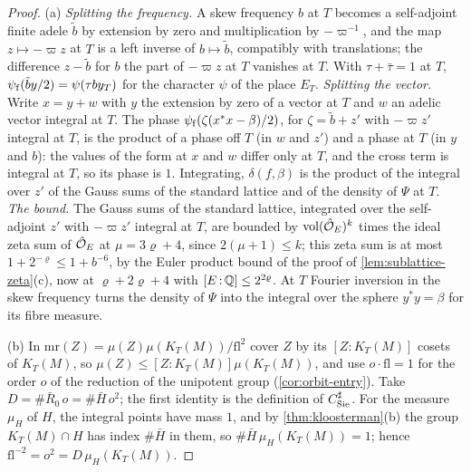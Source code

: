 \begin{proof}
(a) \emph{Splitting the frequency.} A skew frequency $b$ at $T$ becomes a self-adjoint finite adele $\tilde b$ by extension by zero and multiplication by $-\varpi^{-1}$, and the map $z\mapsto-\varpi z$ at $T$ is a left
inverse of $b\mapsto\tilde b$, compatibly with translations; the difference $z-\tilde b$ for $b$ the part of $-\varpi z$ at $T$ vanishes at $T$. With $\tau+\bar\tau=1$ at $T$, $\psi_{\rm f}(\tilde by/2)=\psi(\tau by_T)$ for the character
$\psi$ of the place $E_T$. \emph{Splitting the vector.} Write $x=y+w$ with $y$ the extension by zero of a vector at $T$ and $w$ an adelic vector integral at $T$. The phase $\psi_{\rm f}(\zeta(x^*x-\beta)/2)$, for
$\zeta=\tilde b+z'$ with $-\varpi z'$ integral at $T$, is the product of a phase off $T$ (in $w$ and $z'$) and a phase at $T$ (in $y$ and $b$): the values of the form at $x$ and $w$ differ only at $T$, and the cross term is
integral at $T$, so its phase is $1$. Integrating, $\delta(f,\beta)$ is the product of the integral over $z'$ of the Gauss sums of the standard lattice and of the density of $\Psi$ at $T$. \emph{The bound.} The
Gauss sums of the standard lattice, integrated over the self-adjoint $z'$ with $-\varpi z'$ integral at $T$, are bounded by $\operatorname{vol}(\hat{\mathcal{O}}_E)^k$ times the ideal zeta sum of $\hat{\mathcal{O}}_E$ at $\mu=3\varrho+4$, since
$2(\mu+1)\le k$; this zeta sum is at most $1+2^{-\varrho}\le1+b^{-6}$, by the Euler product bound of the proof of \cref{lem:sublattice-zeta}(c), now at $\varrho+2\varrho+4$
with $[E\,{:}\,\mathbb{Q}]\le2^{2\varrho}$. At $T$ Fourier inversion in the skew frequency turns the density of $\Psi$ into the
integral over the sphere $y^*y=\beta$ for its fibre measure.

(b) In $\mathrm{mr}(Z)=\mu(Z)\mu(K_T(M))/\mathrm{fl}^2$ cover $Z$ by its $[Z:K_T(M)]$ cosets of $K_T(M)$, so $\mu(Z)\le[Z:K_T(M)]\mu(K_T(M))$, and use $o\cdot\mathrm{fl}=1$ for the order $o$ of the reduction of the unipotent group
(\cref{cor:orbit-entry}). Take $D=\#\bar R_0\,o=\#\bar H\,o^2$; the first identity is the definition of $C^\sharp_{\rm Sie}$. For the measure $\mu_H$ of $H$, the integral points have mass $1$, and by \cref{thm:kloosterman}(b) the
group $K_T(M)\cap H$ has index $\#\bar H$ in them, so $\#\bar H\,\mu_H(K_T(M))=1$; hence $\mathrm{fl}^{-2}=o^2=D\,\mu_H(K_T(M))$.


\end{proof}
